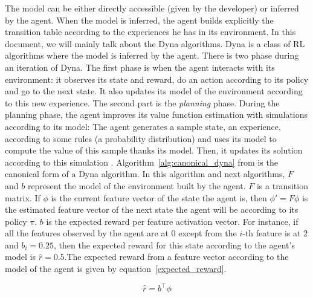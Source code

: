 \documentclass[]{article}
\begin{document}
The model can be either directly accessible (given by the developer) or inferred by the agent. When the model is inferred, the agent builds explicitly the transition table according to the experiences he has in its environment. In this document, we will mainly talk about the Dyna algorithms. Dyna is a class of RL algorithms where the model is inferred by the agent. There is two phase during an iteration of Dyna. The first phase is when the agent interacts with its environment: it observes its state and reward, do an action according to its policy and go to the next state. It also updates its model of the environment according to this new experience. The second part is the \emph{planning} phase. During the planning phase, the agent improves its value function estimation with simulations according to its model: The agent generates a sample state, an experience, according to some rules (a probability distribution) and uses its model to compute the value of this sample thanks its model. Then, it updates its solution according to this simulation \parencite{sutton_dyna-style_2012}.
Algorithm~\ref{alg:canonical_dyna} from \textcite{sutton_dyna-style_2012} is the canonical form of a Dyna algorithm. In this algorithm and next algorithms, \(F\) and \(b\) represent the model of the environment built by the agent. \(F\) is a transition matrix. If \(\phi\) is the current feature vector of the state the agent is, then \(\phi' = F\phi\) is the estimated feature vector of the next state the agent will be according to its policy \(\pi\). \(b\) is the expected reward per feature activation vector. For instance, if all the features observed by the agent are at \(0\) except from the \(i\)-th feature is at \(2\) and \(b_i = 0.25\), then the expected reward for this state according to the agent's model is \(\hat{r} = 0.5\).The expected reward from a feature vector according to the model of the agent is given by equation~\ref{expected_reward}.

\begin{equation}
\hat{r} = b^\top \phi \label{expected_reward}
\end{equation}
\end{document}
